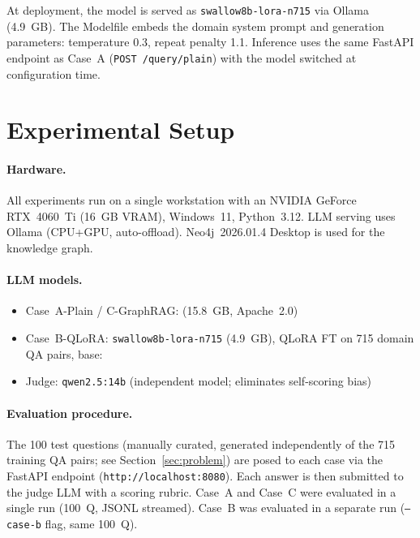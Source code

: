 \documentclass[twocolumn]{article}
\begin{document}
At deployment, the model is served as \texttt{swallow8b-lora-n715} via Ollama (4.9~GB).
The Modelfile embeds the domain system prompt and generation parameters:
temperature 0.3, repeat penalty 1.1.
Inference uses the same FastAPI endpoint as Case~A (\texttt{POST /query/plain})
with the model switched at configuration time.

\section{Experimental Setup}
\label{sec:experiments}

\paragraph{Hardware.}
All experiments run on a single workstation with an NVIDIA GeForce RTX~4060~Ti
(16~GB VRAM), Windows~11, Python~3.12.
LLM serving uses Ollama (CPU+GPU, auto-offload).
Neo4j~2026.01.4 Desktop is used for the knowledge graph.

\paragraph{LLM models.}
\begin{sloppypar}
\begin{itemize}
  \item Case~A-Plain / C-GraphRAG: 
        (15.8~GB, Apache~2.0)
  \item Case~B-QLoRA: \texttt{swallow8b-lora-n715} (4.9~GB), QLoRA FT on 715 domain QA pairs,
        base: 
  \item Judge: \texttt{qwen2.5:14b} (independent model; eliminates self-scoring bias)
\end{itemize}
\end{sloppypar}

\paragraph{Evaluation procedure.}
The 100 test questions (manually curated, generated independently of the 715 training QA pairs;
see Section~\ref{sec:problem}) are posed to each case via the
FastAPI endpoint (\texttt{http://localhost:8080}).
Each answer is then submitted to the judge LLM with a scoring rubric.
Case~A and Case~C were evaluated in a single run (100~Q, JSONL streamed).
Case~B was evaluated in a separate run (\texttt{--case-b} flag, same 100~Q).
\end{document}
